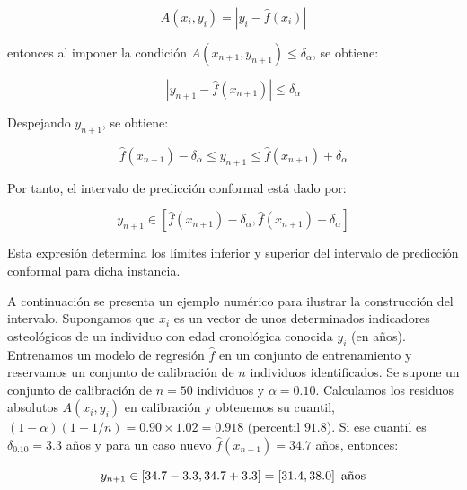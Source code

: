 $$
A(x_i, y_i) = | y_i - \hat{f}(x_i) |
$$

entonces al imponer la condición $A(x_{n+1}, y_{n+1}) \le \delta_\alpha$, se obtiene: 

$$
|y_{n+1}-\hat{f}(x_{n+1})| \le \delta_\alpha
$$

Despejando $y_{n+1}$, se obtiene:

$$
\hat{f}(x_{n+1}) - \delta_\alpha \le y_{n+1} \le \hat{f}(x_{n+1}) + \delta_\alpha 
$$

Por tanto, el intervalo de predicción conformal está dado por:

$$
y_{n+1} \in \left[ \hat{f}(x_{n+1})-\delta_\alpha , \hat{f}(x_{n+1})+\delta_\alpha  \right] 
$$

Esta expresión determina los límites inferior y superior del intervalo de predicción conformal para dicha
instancia.


A continuación se presenta un ejemplo numérico para ilustrar la construcción del intervalo. Supongamos que $x_i$ es un vector de unos determinados indicadores osteológicos de un individuo con edad cronológica conocida $y_i$ (en años). Entrenamos un modelo de regresión $\hat{f}$ en un conjunto de entrenamiento y reservamos un conjunto de calibración de $n$ individuos identificados.
Se supone un conjunto de calibración de $n=50$ individuos y $\alpha=0.10$. Calculamos los residuos absolutos $A(x_i,y_i)$ en calibración y obtenemos su cuantil, $(1-\alpha)(1+1/n)=0.90\times1.02=0.918$ (percentil $91.8$). Si ese cuantil es $\delta_{0.10}=3.3$ años y para un caso nuevo $\hat{f}(x_{n+1})=34.7$ años, entonces:

$$
y_{n+1} \in \left[ 34.7 - 3.3 , 34.7 + 3.3  \right] = \left[ 31.4 , 38.0 \right] \textnormal{ años}
$$

